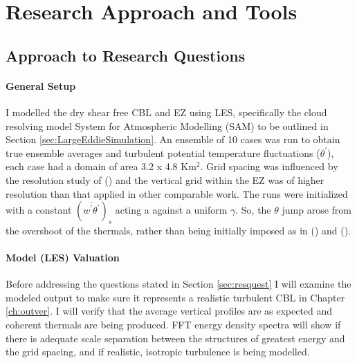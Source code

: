 
\chapter{Research Approach and Tools}

\label{ch:tools}
\setlength{\parindent}{0cm}
\section{Approach to Research Questions}
\label{sec:Approach}
\subsubsection{General Setup}

I modelled the dry shear free \acs{CBL} and \acs{EZ} using \acs{LES}, specifically the cloud resolving model System for Atmospheric Modelling (SAM) to be outlined in Section \ref{sec:LargeEddieSimulation}.  An ensemble of 10 cases was run to obtain true ensemble averages and turbulent potential temperature fluctuations ($\theta^{'}$), each case had a domain of area 3.2 x 4.8 Km$^{2}$. Grid spacing was influenced by the resolution study of \citeauthor{SullPat} (\citeyear{SullPat}) and the vertical grid within the \acs{EZ} was of higher resolution than that applied in other comparable work.  The runs were initialized with a constant $(\overline{w^{'}\theta^{'}})_{s}$ acting a against a uniform $\gamma$.  So, the  $\theta$ jump arose from the overshoot of the thermals, rather than being initially imposed as in \citeauthor{SullMoengStev} (\citeyear{SullMoengStev}) and \citeauthor{BrooksFowler2} (\citeyear{BrooksFowler2}).\\

\subsubsection{Model (\acs{LES}) Valuation}

Before addressing the questions stated in Section \ref{sec:resquest} I will examine the modeled output to make sure it represents a realistic turbulent \acs{CBL} in Chapter \ref{ch:outver}. I will verify that the average vertical profiles are as expected and coherent thermals are being produced.  FFT energy density spectra will show if there is adequate scale separation between the structures of greatest energy and the grid spacing, and if realistic, isotropic turbulence is being modelled.  

